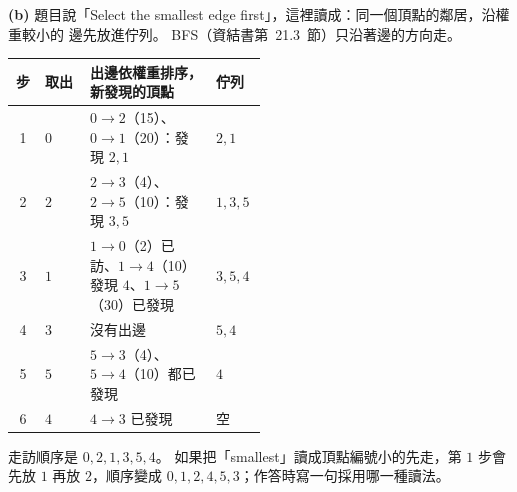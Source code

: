 \begin{pastsoln}
\textbf{(b)} 題目說「Select the smallest edge first」，這裡讀成：同一個頂點的鄰居，沿權重較小的
邊先放進佇列。 BFS（資結書第~21.3~節）只沿著邊的方向走。

\begin{center}
\small
\begin{tabular}{clp{0.5\linewidth}l}
\toprule
步 & 取出 & 出邊依權重排序，新發現的頂點 & 佇列 \\
\midrule
1 & $0$ & $0 \to 2$（15）、$0 \to 1$（20）：發現 $2, 1$ & $2, 1$ \\
2 & $2$ & $2 \to 3$（4）、$2 \to 5$（10）：發現 $3, 5$ & $1, 3, 5$ \\
3 & $1$ & $1 \to 0$（2）已訪、$1 \to 4$（10）發現 $4$、$1 \to 5$（30）已發現 & $3, 5, 4$ \\
4 & $3$ & 沒有出邊 & $5, 4$ \\
5 & $5$ & $5 \to 3$（4）、$5 \to 4$（10）都已發現 & $4$ \\
6 & $4$ & $4 \to 3$ 已發現 & 空 \\
\bottomrule
\end{tabular}
\end{center}

走訪順序是 $0, 2, 1, 3, 5, 4$。 如果把「smallest」讀成頂點編號小的先走，第 $1$ 步會先放 $1$
再放 $2$，順序變成 $0, 1, 2, 4, 5, 3$；作答時寫一句採用哪一種讀法。
\end{pastsoln}
